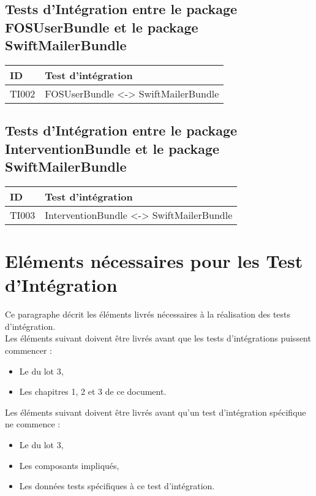   	
  	\subsection*{Tests d'Intégration entre le package FOSUserBundle et le package SwiftMailerBundle}
 	
 	\begin{center}
    		\begin{tabular}[h]{|p{}|p{}|}
		\hline
			ID & Test d'intégration \\\hline
			TI002 & FOSUserBundle <-> SwiftMailerBundle \\\hline
    	 	\end{tabular}
  	\end{center}
  	
  	\subsection*{Tests d'Intégration entre le package InterventionBundle et le package SwiftMailerBundle}
 	
 	\begin{center}
    		\begin{tabular}[h]{|p{}|p{}|}
		\hline
			ID & Test d'intégration \\\hline
			TI003 & InterventionBundle <-> SwiftMailerBundle \\\hline
    	 	\end{tabular}
  	\end{center}
  	
  	
  	
 	
  \section{Eléments nécessaires pour les Test d'Intégration}
  	Ce paragraphe décrit les éléments livrés nécessaires à la réalisation des tests d'intégration. \\
  	
  	Les éléments suivant doivent être livrés avant que les tests d'intégrations puissent commencer :
  	\begin{itemize}
  		\item Le \PTU du lot 3,
  		\item Les chapitres 1, 2 et 3 de ce document.
  	\end{itemize}
  	
  	Les éléments suivant doivent être livrés avant qu'un test d'intégration spécifique ne commence :
  	\begin{itemize}
  		\item Le \JTU du lot 3,
  		\item Les composants impliqués,
  		\item Les données tests spécifiques à ce test d'intégration.
  	\end{itemize}
  
